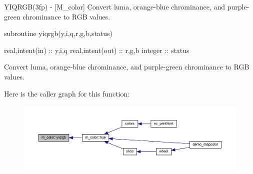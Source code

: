\begin{DoxyDescription}
\item[\label{_YIQRGB}%
N\+A\+ME ]Y\+I\+Q\+R\+G\+B(3fp) -\/ \mbox{[}M\+\_\+color\mbox{]} Convert luma, orange-\/blue chrominance, and purple-\/green chrominance to R\+GB values. 


\item[S\+Y\+N\+O\+P\+S\+IS ]
\begin{DoxyPre}
    subroutine yiqrgb(y,i,q,r,g,b,status)\end{DoxyPre}



\begin{DoxyPre}     real,intent(in)  :: y,i,q
     real,intent(out) :: r,g,b
     integer          :: status
    \end{DoxyPre}
 


\item[D\+E\+S\+C\+R\+I\+P\+T\+I\+ON ]

Convert luma, orange-\/blue chrominance, and purple-\/green chrominance to R\+GB values.




\end{DoxyDescription}Here is the caller graph for this function\+:
\nopagebreak
\begin{figure}[H]
\begin{center}
\leavevmode
\includegraphics[width=350pt]{namespacem__color_ac9cd845fb9975144a6deb3a21ce29a29_icgraph}
\end{center}
\end{figure}
